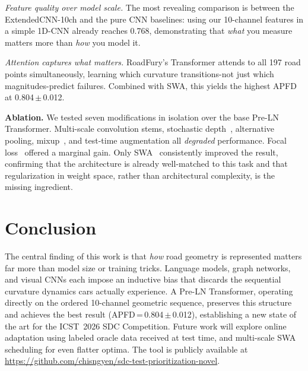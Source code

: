 ﻿\documentclass[conference]{IEEEtran}
\begin{document}
\emph{Feature quality over model scale.} The most revealing comparison is between the ExtendedCNN-10ch and the pure CNN baselines: using our 10-channel features in a simple 1D-CNN already reaches 0.768, demonstrating that \emph{what} you measure matters more than \emph{how} you model it.

\emph{Attention captures what matters.} RoadFury's Transformer attends to all 197 road points simultaneously, learning which curvature transitions-not just which magnitudes-predict failures. Combined with SWA, this yields the highest APFD at 0.804\,$\pm$\,0.012.

\textbf{Ablation.} We tested seven modifications in isolation over the base Pre-LN Transformer. Multi-scale convolution stems, stochastic depth~\cite{b20}, alternative pooling, mixup~\cite{b19}, and test-time augmentation all \emph{degraded} performance. Focal loss~\cite{b18} offered a marginal gain. Only SWA~\cite{b6} consistently improved the result, confirming that the architecture is already well-matched to this task and that regularization in weight space, rather than architectural complexity, is the missing ingredient.

\section{Conclusion}

The central finding of this work is that \emph{how} road geometry is represented matters far more than model size or training tricks. Language models, graph networks, and visual CNNs each impose an inductive bias that discards the sequential curvature dynamics cars actually experience. A Pre-LN Transformer, operating directly on the ordered 10-channel geometric sequence, preserves this structure and achieves the best result (APFD\,=\,0.804\,$\pm$\,0.012), establishing a new state of the art for the ICST~2026 SDC Competition. Future work will explore online adaptation using labeled oracle data received at test time, and multi-scale SWA scheduling for even flatter optima. The tool is publicly available at \url{https://github.com/chisngyen/sdc-test-prioritization-novel}.
\end{document}

